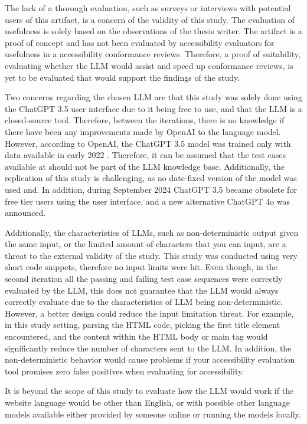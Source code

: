 The lack of a thorough evaluation, such as surveys or interviews with potential users of this artifact, is a concern of the validity of this study. The evaluation of usefulness is solely based on the observations of the thesis writer. The artifact is a proof of concept and has not been evaluated by accessibility evaluators for usefulness in a accessibility conformance reviews. Therefore, a proof of suitability, evaluating whether the LLM would assist and speed up conformance reviews, is yet to be evaluated that would support the findings of the study. 

Two concerns regarding the chosen LLM are that this study was solely done using the ChatGPT 3.5 user interface due to it being free to use, and that the LLM is a closed-source tool. Therefore, between the iterations, there is no knowledge if there have been any improvements made by OpenAI to the language model. However, according to OpenAI, the ChatGPT 3.5 model was trained only with data available in early 2022 \citep{openai_35}. Therefore, it can be assumed that the test cases available at \textcite{act_rule_g88} should not be part of the LLM knowledge base. Additionally, the replication of this study is challenging, as no date-fixed version of the model was used and. In addition, during September 2024 ChatGPT 3.5 became obsolete for free tier users using the user interface, and a new alternative ChatGPT 4o was announced.

Additionally, the characteristics of LLMs, such as non-deterministic output given the same input, or the limited amount of characters that you can input, are a threat to the external validity of the study. This study was conducted using very short code snippets, therefore no input limits were hit. Even though, in the second iteration all the passing and failing test case sequences were correctly evaluated by the LLM, this does not guarantee that the LLM would always correctly evaluate due to the characteristics of LLM being non-deterministic. However, a better design could reduce the input limitation threat. For example, in this study setting, parsing the HTML code, picking the first title element encountered, and the content within the HTML body or main tag would significantly reduce the number of characters sent to the LLM. In addition, the non-deterministic behavior would cause problems if your accessibility evaluation tool promises zero false positives when evaluating for accessibility.

It is beyond the scope of this study to evaluate how the LLM would work if the website language would be other than English, or with possible other language models available either provided by someone online or running the models locally.

